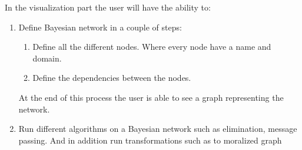 \documentclass{article}
\begin{document}
    In the visualization part the user will have the ability to:
    \begin{enumerate}
        \item Define Bayesian network in a couple of steps:
        \begin{enumerate}
            \item Define all the different nodes. Where every node have a name and domain.
            \item Define the dependencies between the nodes.
        \end{enumerate}
        At the end of this process the user is able to see a graph representing the network.
        \item Run different algorithms on a Bayesian network such as elimination, message passing. And in addition run transformations such as to moralized graph 
    \end{enumerate}

    \vspace{0.5cm}
\end{document}
